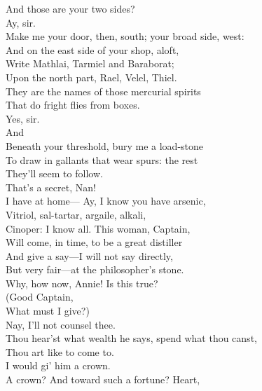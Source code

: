 \documentclass[a4paper,oneside,12pt]{memoir}
\begin{document}
\begin{drama*}
\subtlespeaks {} And those are your two sides?\\
\druggerspeaks {} Ay, sir.\\
\subtlespeaks Make me your door, then, south; your broad side, west:\\
And on the east side of your shop, aloft,\\
Write Mathlai, Tarmiel and Baraborat;\\
Upon the north part, Rael, Velel, Thiel.\\
They are the names of those mercurial spirits\\
That do fright flies from boxes.\\
\druggerspeaks {} Yes, sir.\\
\subtlespeaks {} And\\
Beneath your threshold, bury me a load-stone\\
To draw in gallants that wear spurs: the rest\\
They'll seem to follow.\\
\facespeaks {} That's a secret, Nan!\\
\druggerspeaks I have at home---
\subtlespeaks {} Ay, I know you have arsenic,\\
Vitriol, sal-tartar, argaile, alkali,\\
Cinoper: I know all. This woman, Captain,\\
Will come, in time, to be a great distiller\\
And give a say---I will not say directly,\\
But very fair---at the philosopher's stone.\\
\facespeaks Why, how now, Annie! Is this true?\\
\druggerspeaks {} (Good Captain,\\
What must I give?)\\
\facespeaks {} Nay, I'll not counsel thee.\\
Thou hear'st what wealth he says, spend what thou canst,\\
Thou art like to come to.\\
\druggerspeaks {} I would gi' him a crown.\\
\facespeaks A crown? And toward such a fortune? Heart,\\

\end{drama*}
\end{document}
